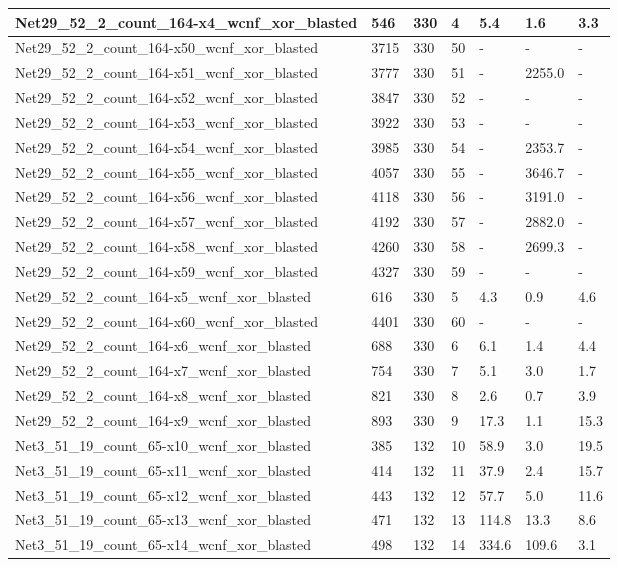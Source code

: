 \begin{scriptsize}
\begin{longtable}{|p{5cm}|l|l|l|l|l|l|}
Net29\_52\_2\_count\_164-x4\_wcnf\_xor\_blasted&546&330&4&5.4&1.6&3.3 \\ \hline 
Net29\_52\_2\_count\_164-x50\_wcnf\_xor\_blasted&3715&330&50&-&-&- \\ \hline 
Net29\_52\_2\_count\_164-x51\_wcnf\_xor\_blasted&3777&330&51&-&2255.0&- \\ \hline 
Net29\_52\_2\_count\_164-x52\_wcnf\_xor\_blasted&3847&330&52&-&-&- \\ \hline 
Net29\_52\_2\_count\_164-x53\_wcnf\_xor\_blasted&3922&330&53&-&-&- \\ \hline 
Net29\_52\_2\_count\_164-x54\_wcnf\_xor\_blasted&3985&330&54&-&2353.7&- \\ \hline 
Net29\_52\_2\_count\_164-x55\_wcnf\_xor\_blasted&4057&330&55&-&3646.7&- \\ \hline 
Net29\_52\_2\_count\_164-x56\_wcnf\_xor\_blasted&4118&330&56&-&3191.0&- \\ \hline 
Net29\_52\_2\_count\_164-x57\_wcnf\_xor\_blasted&4192&330&57&-&2882.0&- \\ \hline 
Net29\_52\_2\_count\_164-x58\_wcnf\_xor\_blasted&4260&330&58&-&2699.3&- \\ \hline 
Net29\_52\_2\_count\_164-x59\_wcnf\_xor\_blasted&4327&330&59&-&-&- \\ \hline 
Net29\_52\_2\_count\_164-x5\_wcnf\_xor\_blasted&616&330&5&4.3&0.9&4.6 \\ \hline 
Net29\_52\_2\_count\_164-x60\_wcnf\_xor\_blasted&4401&330&60&-&-&- \\ \hline 
Net29\_52\_2\_count\_164-x6\_wcnf\_xor\_blasted&688&330&6&6.1&1.4&4.4 \\ \hline 
Net29\_52\_2\_count\_164-x7\_wcnf\_xor\_blasted&754&330&7&5.1&3.0&1.7 \\ \hline 
Net29\_52\_2\_count\_164-x8\_wcnf\_xor\_blasted&821&330&8&2.6&0.7&3.9 \\ \hline 
Net29\_52\_2\_count\_164-x9\_wcnf\_xor\_blasted&893&330&9&17.3&1.1&15.3 \\ \hline 
Net3\_51\_19\_count\_65-x10\_wcnf\_xor\_blasted&385&132&10&58.9&3.0&19.5 \\ \hline 
Net3\_51\_19\_count\_65-x11\_wcnf\_xor\_blasted&414&132&11&37.9&2.4&15.7 \\ \hline 
Net3\_51\_19\_count\_65-x12\_wcnf\_xor\_blasted&443&132&12&57.7&5.0&11.6 \\ \hline 
Net3\_51\_19\_count\_65-x13\_wcnf\_xor\_blasted&471&132&13&114.8&13.3&8.6 \\ \hline 
Net3\_51\_19\_count\_65-x14\_wcnf\_xor\_blasted&498&132&14&334.6&109.6&3.1 \\ \hline 

\end{longtable}
\end{scriptsize}
